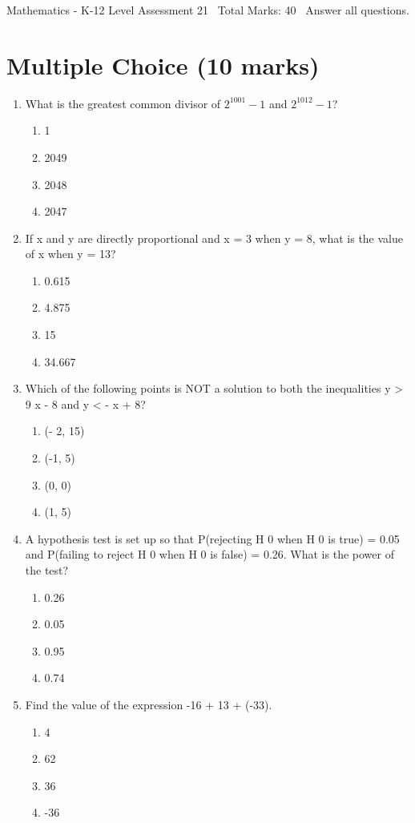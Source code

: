 \documentclass[12pt]{article}
\begin{document}
\begin{center}
Mathematics - K-12 Level Assessment 21 \
Total Marks: 40 \
Answer all questions.
\end{center}

\section*{Multiple Choice (10 marks)}
\begin{enumerate}[label=\arabic*.]
\item What is the greatest common divisor of $2^{1001}-1$ and $2^{1012}-1$?
\begin{enumerate}[label=(\alph*)]
    \item 1
    \item 2049
    \item 2048
    \item 2047
\end{enumerate}
\item If x and y are directly proportional and x = 3 when y = 8, what is the value of x when y = 13?
\begin{enumerate}[label=(\alph*)]
    \item 0.615
    \item 4.875
    \item 15
    \item 34.667
\end{enumerate}
\item Which of the following points is NOT a solution to both the inequalities y \textgreater{} 9 x - 8 and y \textless{} - x + 8?
\begin{enumerate}[label=(\alph*)]
    \item (- 2, 15)
    \item (-1, 5)
    \item (0, 0)
    \item (1, 5)
\end{enumerate}
\item A hypothesis test is set up so that P(rejecting H 0 when H 0 is true) = 0.05 and P(failing to reject H 0 when H 0 is false) = 0.26. What is the power of the test?
\begin{enumerate}[label=(\alph*)]
    \item 0.26
    \item 0.05
    \item 0.95
    \item 0.74
\end{enumerate}
\item Find the value of the expression -16 + 13 + (-33).
\begin{enumerate}[label=(\alph*)]
    \item 4
    \item 62
    \item 36
    \item -36
\end{enumerate}
\end{enumerate}
\end{document}
